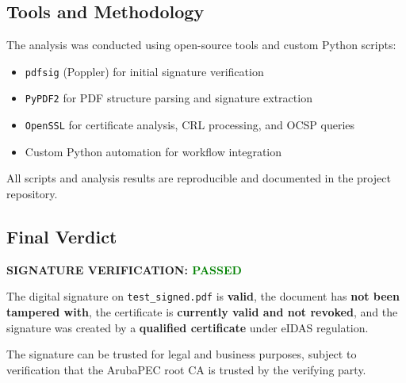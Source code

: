 \documentclass[12pt,a4paper]{article}
\begin{document}
\subsection{Tools and Methodology}

The analysis was conducted using open-source tools and custom Python scripts:
\begin{itemize}
    \item \texttt{pdfsig} (Poppler) for initial signature verification
    \item \texttt{PyPDF2} for PDF structure parsing and signature extraction
    \item \texttt{OpenSSL} for certificate analysis, CRL processing, and OCSP queries
    \item Custom Python automation for workflow integration
\end{itemize}

All scripts and analysis results are reproducible and documented in the project repository.

\subsection{Final Verdict}

\begin{center}
\large\textbf{SIGNATURE VERIFICATION: \textcolor{green}{PASSED}}
\end{center}

The digital signature on \texttt{test\_signed.pdf} is \textbf{valid}, the document has \textbf{not been tampered with}, the certificate is \textbf{currently valid and not revoked}, and the signature was created by a \textbf{qualified certificate} under eIDAS regulation.

The signature can be trusted for legal and business purposes, subject to verification that the ArubaPEC root CA is trusted by the verifying party.
\end{document}
